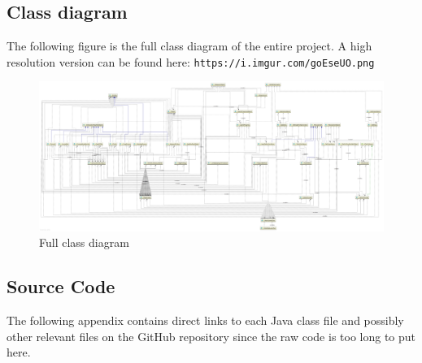 \documentclass[12p]{article}
\begin{document}
\subsection{Class diagram} \label{AppendixClassDiagramFull}

The following figure is the full class diagram of the entire project. A high resolution version can be found here: \texttt{https://i.imgur.com/goEseUO.png}

\begin{figure}[ht]
  \centering
  \includegraphics[width=1\textwidth]{Documentation/class_diagram}
  \caption{Full class diagram}
  \label{fig:ClassDiagramFull}
\end{figure}


\newpage
\subsection{Source Code} \label{SourceCode}

The following appendix contains direct links to each Java class file and possibly other relevant files on the GitHub repository since the raw code is too long to put here.
\end{document}
